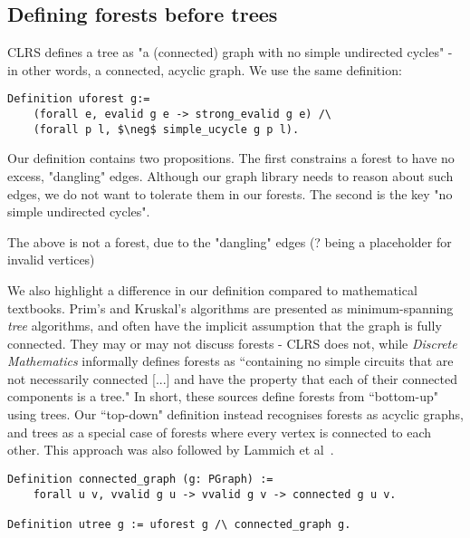 \subsection{Defining forests before trees}

CLRS defines a tree as "a (connected) graph with no simple undirected cycles" - in other words, a connected, acyclic graph. We use the same definition:
\begin{lstlisting}
Definition uforest g:=
	(forall e, evalid g e -> strong_evalid g e) /\
	(forall p l, $\neg$ simple_ucycle g p l).
\end{lstlisting}
Our definition contains two propositions. The first constrains a forest to have no excess, "dangling" edges. Although our graph library needs to reason about such edges, we do not want to tolerate them in our forests. The second is the key "no simple undirected cycles".
\begin{center}
	\newline
	The above is not a forest, due to the "dangling" edges (? being a placeholder for invalid vertices)
\end{center}
We also highlight a difference in our definition compared to mathematical textbooks. Prim's and Kruskal's algorithms are presented as minimum-spanning \textit{tree} algorithms, and often have the implicit assumption that the graph is fully connected. They may or may not discuss forests - CLRS does not, while \textit{Discrete Mathematics} informally defines forests as ``containing no simple circuits that are not necessarily connected [...] and have the property that each of their connected components is a tree." In short, these sources define forests from ``bottom-up" using trees. Our ``top-down" definition instead recognises forests as acyclic graphs, and trees as a special case of forests where every vertex is connected to each other. This approach was also followed by Lammich et al~\cite{DBLP:journals/afp/LammichN19}.
\begin{lstlisting}
Definition connected_graph (g: PGraph) :=
	forall u v, vvalid g u -> vvalid g v -> connected g u v.

Definition utree g := uforest g /\ connected_graph g.
\end{lstlisting}
